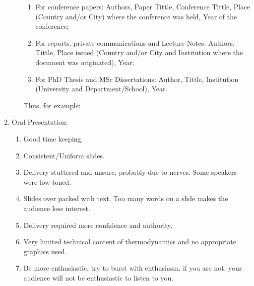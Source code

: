 \documentclass[14pt,twoside]{report}
\begin{document}
\begin{enumerate}
\begin{enumerate}
\begin{enumerate}
\item For conference papers: Authors, Paper Tittle, Conference Tittle, Place (Country and/or City) where the conference was held, Year of the conference;
\item For reports,  private communications and Lecture Notes: Authors, Tittle, Place issued (Country and/or City and Institution where the document was originated), Year;
\item For PhD Thesis and MSc Dissertations: Author, Tittle, Institution (University and Department/School), Year.
\end{enumerate}  
Thus, for example:
%
\end{enumerate}

\item Oral Presentation:
\begin{enumerate}
%
\item Good time keeping.
%
\item Consistent/Uniform slides.
%
\item Delivery stuttered and unsure, probably due to nerves. Some speakers were low toned.
%
\item Slides over packed with text. Too many words on a slide makes the audience lose interest.
%
\item Delivery required more confidence and authority.
%
\item Very limited technical content of thermodynamics and no appropriate graphics used.
%
\item Be more enthusiastic, try to burst with enthusiasm, if you are not, your audience will not be enthusiastic to listen to you.
%
\end{enumerate}

\end{enumerate}
\end{document}
